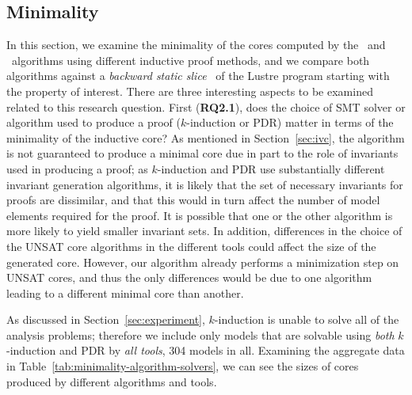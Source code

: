 \subsection{Minimality}
\label{sec:minimality}
In this section, we examine the minimality of the cores computed by
the \ucalg\ and \ucbfalg\ algorithms using different inductive proof methods, and we compare both algorithms against a {\em backward static slice}~\cite{Tip95asurvey} of the Lustre program starting with the property of interest.
There are three interesting aspects to be examined
related to this research question.  First (\textbf{RQ2.1}), does the
choice of SMT solver or algorithm used to produce a proof
($k$-induction or PDR) matter in terms of the minimality of the
inductive core?  As mentioned in Section~\ref{sec:ivc}, the \ucalg
algorithm is not guaranteed to produce a minimal core due in part to
the role of invariants used in producing a proof; as $k$-induction and
PDR use substantially different invariant generation algorithms, it is
likely that the set of necessary invariants for proofs are dissimilar,
and that this would in turn affect the number of model elements required for
the proof.  It is possible that one or the other algorithm is more likely
to yield smaller invariant sets.  In addition, differences in the choice of the
UNSAT core algorithms in the different tools could affect the size of the
generated core. However, our algorithm already performs a minimization
step on UNSAT cores, and thus the only differences would be due to one
algorithm leading to a different minimal core than another.

As discussed in Section~\ref{sec:experiment}, $k$-induction is unable to solve all of the analysis problems; therefore we include only models that are solvable using {\em both} $k$-induction and PDR by {\em all tools}, 304 models in all.  Examining the aggregate data in Table~\ref{tab:minimality-algorithm-solvers}, we can see the sizes of cores produced by different algorithms and tools.




